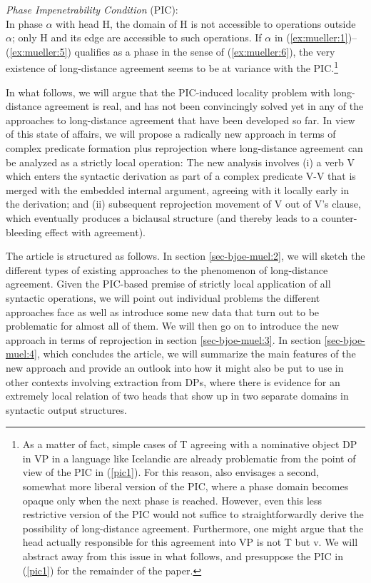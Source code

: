 \documentclass[output=paper
,modfonts
,nonflat]{langsci/langscibook}
\begin{document}
	\ea\label{ex:mueller:6} {\itshape Phase Impenetrability Condition} \label{pic1}(PIC):\\
	In phase $\alpha$ with head H, the domain of H is not accessible to
	operations outside $\alpha$; only H and its edge are accessible to such
	operations.
	\z
{\noindent}If $\alpha$ in (\ref{ex:mueller:1})--(\ref{ex:mueller:5}) qualifies as a phase in the sense of
	(\ref{ex:mueller:6}), the very existence of long-distance agreement seems to be at
	variance with the PIC.\footnote{\label{fn1}As a matter of fact, simple cases of T
		agreeing with a nominative object DP in VP in a language like
		Icelandic are already problematic from the point of view of the PIC
		in (\ref{pic1}). For this reason, \citet{Chomsky:01} also envisages a
		second, somewhat more liberal version of the PIC, where a phase
		domain becomes opaque only when the next phase is reached. However, even
		this less restrictive version of the PIC would not suffice to
		straightforwardly derive the possibility of long-distance
		agreement. Furthermore, one might argue that the head actually
		responsible for this agreement into VP is not T but v. We will
		abstract away from this issue in what follows, and presuppose the
		PIC in (\ref{pic1}) for the remainder of the paper.}
	
\noindent In what follows, we will argue that the PIC-induced locality problem
	with long-distance agreement is real, and has not been
	convincingly solved yet in any of the approaches to long-distance
	agreement that have been developed so far. In view of this state of
	affairs, we will propose a radically new approach in terms of complex
	predicate formation plus reprojection where long-distance agreement
	can be analyzed as a strictly local operation: The new analysis  involves (i) a verb
	V which enters the syntactic derivation as part of a complex
	predicate V-V that is merged with the embedded internal argument,
	agreeing with it locally early in the derivation; and (ii) subsequent
	reprojection movement of V out of V's clause, which eventually
	produces a biclausal structure (and thereby leads to a
	counter-bleeding effect with agreement). 
	
	The article is structured as follows. In section \ref{sec-bjoe-muel:2}, we will sketch the
	different types of existing approaches to the phenomenon of
	long-distance agreement. Given the PIC-based premise of strictly local
	application of all syntactic operations, we will point out individual
	problems the different approaches face as well as introduce some new
	data that turn out to be problematic for almost all of them. We will
	then go on to introduce the new approach in terms of reprojection in
	section \ref{sec-bjoe-muel:3}. In section \ref{sec-bjoe-muel:4}, which concludes the article, we will
	summarize the main features of the new approach and provide an outlook
	into how it might also be put to use in other contexts involving
	extraction from DPs, where there is evidence for an extremely local
	relation of two heads that show up in two separate domains in
	syntactic output structures.
	
\end{document}
